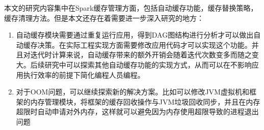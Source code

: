 本文的研究内容集中在Spark缓存管理方面，包括自动缓存功能，缓存替换策略，缓存清理方法。但是本文还存在着需要进一步深入研究的地方：

\begin{enumerate}
    \item 自动缓存模块需要通过重复运行应用，得到DAG图结构进行分析才可以做出自动缓存决策。在实际工程实现方面需要修改应用代码才可以实现这个功能。并且对迭代时计算来说，自动缓存带来的额外开销会随着迭代次数变多而随之变大。后续研究中可以探索其他自动缓存功能的实现方式，从而可以在不影响应用执行效率的前提下简化编程人员编程。
    \item 对于OOM问题，可以继续探索新的解决方案。比如可以修改JVM虚拟机和框架的内存管理模块，将框架的缓存回收操作与JVM垃圾回收同步，并且在内存超限时自动申请对外内存，这样就可以避免因为内存使用超限导致的进程退出问题
\end{enumerate}